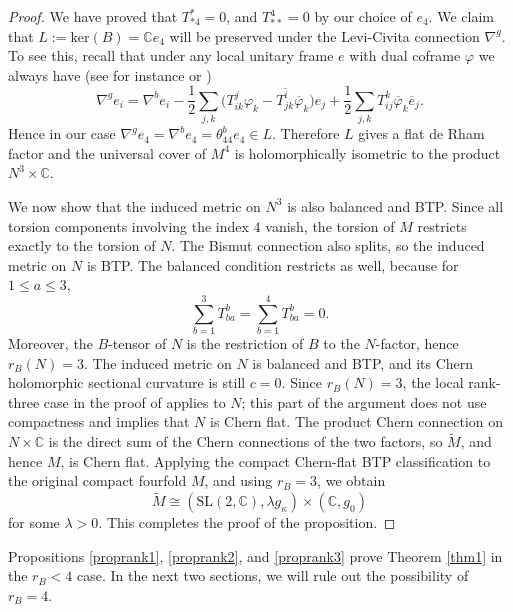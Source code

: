 \documentclass{amsart}
\begin{document}
\begin{proof}
We have proved that $T^{\ast}_{\ast 4}=0$, and $T^4_{\ast \ast}=0$ by our choice of $e_4$. We claim that $L:=\mbox{ker}(B)= {\mathbb C}e_4$ will be preserved under the Levi-Civita connection $\nabla^g$. To see this, recall that under any local unitary frame $e$ with dual coframe $\varphi$ we always have (see for instance \cite{YangZ} or \cite{ZhaoZ24})
$$ \nabla^ge_i = \nabla^be_i - \frac{1}{2}\sum_{j,k} \big( T^j_{ik}\varphi_k - \overline{T^i_{jk} } \overline{\varphi}_k \big) e_j + \frac{1}{2} \sum_{j,k}T^k_{ij} \overline{\varphi}_k \overline{e}_j . $$
Hence in our case $\nabla^ge_4 = \nabla^be_4 = \theta^b_{44}e_4 \in L$. Therefore $L$ gives a flat de Rham factor and the universal cover of $M^4$ is holomorphically isometric to the product $N^3\times {\mathbb C}$.

We now show that the induced metric on $N^3$ is also balanced and BTP.  Since all torsion components involving the index \(4\) vanish, the torsion of \(M\) restricts exactly to the torsion of \(N\).  The Bismut connection also splits, so the induced metric on \(N\) is BTP.  The balanced condition restricts as well, because for \(1\le a\le3\),
$$
\sum_{b=1}^3T^b_{ba}=\sum_{b=1}^4T^b_{ba}=0.
$$
Moreover, the \(B\)-tensor of \(N\) is the restriction of \(B\) to the \(N\)-factor, hence \(r_B(N)=3\). The induced metric on \(N\) is balanced and BTP, and its Chern holomorphic sectional curvature is still \(c=0\). Since \(r_B(N)=3\), the local rank-three case in the proof of \cite[Proposition 2.4, Case 2]{ZhaoZ25} applies to \(N\); this part of the argument does not use compactness and implies that \(N\) is Chern flat. The product Chern connection on \(N\times {\mathbb C}\) is the direct sum of the Chern connections of the two factors, so \(\widetilde M\), and hence \(M\), is Chern flat. Applying the compact Chern-flat BTP classification \cite[Theorem 1.2 and Theorem 3.4]{PodestaZ} to the original compact fourfold \(M\), and using \(r_B=3\), we obtain
$$
\widetilde M\cong(\mbox{SL}(2,{\mathbb C}),\lambda g_{\kappa})\times({\mathbb C},g_0)
$$
for some \(\lambda>0\). This completes the proof of the proposition.
\end{proof}

Propositions \ref{proprank1}, \ref{proprank2}, and \ref{proprank3} prove Theorem \ref{thm1} in the $r_B<4$ case. In the next two sections, we will rule out the possibility of $r_B=4$.






\vspace{0.3cm}
\end{document}
